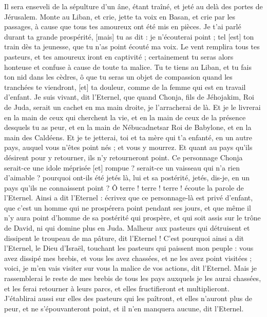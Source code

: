 \begin{multicols}{2}
Il sera enseveli de la sépulture d'un âne, étant traîné, et jeté au delà des portes de Jérusalem.
Monte au Liban, et crie, jette ta voix en Basan, et crie par les passages, à cause que tous tes amoureux ont été mis en pièces.
Je t'ai parlé durant ta grande prospérité, [mais] tu as dit : je n'écouterai point ; tel [est] ton train dès ta jeunesse, que tu n'as point écouté ma voix.
Le vent remplira tous tes pasteurs, et tes amoureux iront en captivité ; certainement tu seras alors honteuse et confuse à cause de toute ta malice.
Tu te tiens au Liban, et tu fais ton nid dans les cèdres, ô que tu seras un objet de compassion quand les tranchées te viendront, [et] ta douleur, comme de la femme qui est en travail d'enfant.
Je suis vivant, dit l'Eternel, que quand Chonja, fils de Jéhojakim, Roi de Juda, serait un cachet en ma main droite, je l'arracherai de là.
Et je le livrerai en la main de ceux qui cherchent la vie, et en la main de ceux de la présence desquels tu as peur, et en la main de Nébucadnetsar Roi de Babylone, et en la main des Caldéens.
Et je te jetterai, toi et ta mère qui t'a enfanté, en un autre pays, auquel vous n'êtes point nés ; et vous y mourrez.
Et quant au pays qu’ils désirent pour y retourner, ils n'y retourneront point.
Ce personnage Chonja serait-ce une idole méprisée [et] rompue ? serait-ce un vaisseau qui n’a rien d’aimable ? pourquoi ont-ils été jetés là, lui et sa postérité, jetés, dis-je, en un pays qu'ils ne connaissent point ?
Ô terre ! terre ! terre ! écoute la parole de l'Eternel.
Ainsi a dit l'Eternel : écrivez que ce personnage-là est privé d'enfant, que c'est un homme qui ne prospérera point pendant ses jours, et que même il n'y aura point d'homme de sa postérité qui prospère, et qui soit assis sur le trône de David, ni qui domine plus en Juda.
\VerseOne{}Malheur aux pasteurs qui détruisent et dissipent le troupeau de ma pâture, dit l'Eternel !
C'est pourquoi ainsi a dit l'Eternel, le Dieu d'Israël, touchant les pasteurs qui paissent mon peuple : vous avez dissipé mes brebis, et vous les avez chassées, et ne les avez point visitées ; voici, je m'en vais visiter sur vous la malice de vos actions, dit l'Eternel.
Mais je rassemblerai le reste de mes brebis de tous les pays auxquels je les aurai chassées, et les ferai retourner à leurs parcs, et elles fructifieront et multiplieront.
J'établirai aussi sur elles des pasteurs qui les paîtront, et elles n'auront plus de peur, et ne s'épouvanteront point, et il n'en manquera aucune, dit l'Eternel.

\end{multicols}
